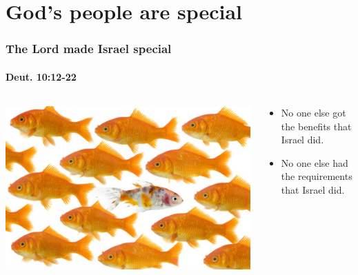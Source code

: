 \section{God's people are special}

\begin{frame}
\frametitle{The Lord made Israel special}
\framesubtitle{Deut. 10:12-22}
\begin{columns}[T]
\begin{column}{0.5\textwidth}
\begin{center}
\includegraphics[width=\columnwidth]{figures/uniqueFish.jpg}
\end{center}
\end{column}
\begin{column}{0.5\textwidth}
\begin{itemize}
\item No one else got the benefits that Israel did.
\item No one else had the requirements that Israel did.
\end{itemize}
\end{column}
\end{columns}

\end{frame}

